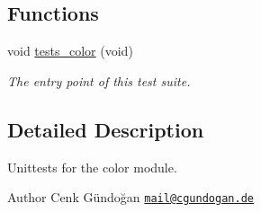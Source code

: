 \subsection*{Functions}
\begin{DoxyCompactItemize}
\item 
void \hyperlink{group__unittests_ga211fe87abc68d3c2ef15a3db1dfbcb48}{tests\+\_\+color} (void)
\begin{DoxyCompactList}\small\item\em The entry point of this test suite. \end{DoxyCompactList}\end{DoxyCompactItemize}


\subsection{Detailed Description}
Unittests for the {\ttfamily color} module. 

\begin{DoxyAuthor}{Author}
Cenk Gündoğan \href{mailto:mail@cgundogan.de}{\tt mail@cgundogan.\+de} 
\end{DoxyAuthor}
